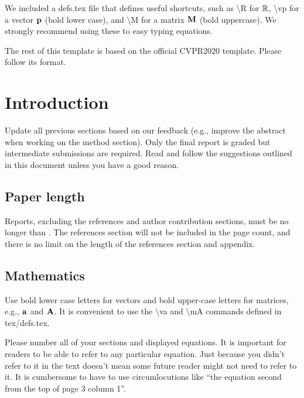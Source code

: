 \documentclass[10pt,twocolumn,letterpaper]{article}
\begin{document}
We included a defs.tex file that defines useful shortcuts, such as \textbackslash R for $\mathbb{R}$, \textbackslash vp for a vector $\mathbf{p}$ (bold lower case), and \textbackslash M for a matrix $\mathbf{M}$ (bold uppercase). We strongly recommend using these to easy typing equations. 

The rest of this template is based on the official CVPR2020 template. Please follow its format.

\section{Introduction}

 Update all previous sections based on our feedback (e.g., improve the abstract when working on the method section). Only the final report is graded but intermediate submissions are required. Read and follow the suggestions outlined in this document unless you have a good reason.  


\subsection{Paper length}
Reports, excluding the references and author contribution sections,
must be no longer than . The references section
will not be included in the page count, and there is no limit on the
length of the references section and appendix. 

\subsection{Mathematics}

Use bold lower case letters for vectors and bold upper-case letters for matrices, e.g., $\mathbf{a}$ and $\mathbf{A}$. It is convenient to use the \textbackslash va and \textbackslash mA commands defined in tex/defs.tex. 

Please number all of your sections and displayed equations.  It is
important for readers to be able to refer to any particular equation.  Just
because you didn't refer to it in the text doesn't mean some future reader
might not need to refer to it.  It is cumbersome to have to use
circumlocutions like ``the equation second from the top of page 3 column
1''.  
\end{document}
